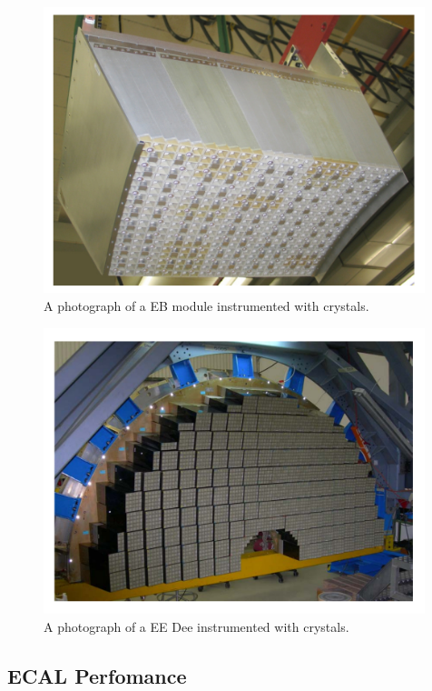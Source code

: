 \begin{figure}
 \centering
\includegraphics[width=0.99\textwidth]{CMS_DetectorFigures/ECALEB_Module.pdf}
\caption{A photograph of a EB module instrumented with crystals.\label{fig:ECALEB_module}}
\end{figure}
\begin{figure}
 \centering
\includegraphics[width=0.99\textwidth]{CMS_DetectorFigures/ECALEE_Module.pdf}
\caption{A photograph of a EE Dee instrumented with crystals.\label{fig:ECALEE_module}}
\end{figure}
\subsection{ECAL Perfomance}

